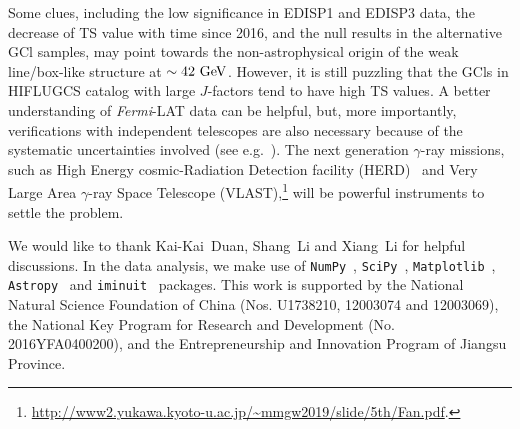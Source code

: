 \documentclass[
	twocolumn,
]{aastex6} %
\newcommand{\lat}{\emph{Fermi}-LAT\xspace}
\newcommand{\gr}{$\gamma$-ray\xspace}
\begin{document}
Some clues, including the low significance in EDISP1 and EDISP3 data,
the decrease of TS value with time since 2016, and the null results in the alternative GCl samples, may point towards the non-astrophysical origin of the weak line/box-like structure at $\sim 42~\rm GeV$.
However, it is still puzzling that the GCls in HIFLUGCS catalog with large $J$-factors tend to have high TS values.
A better understanding of \lat data can be helpful, but, more importantly, verifications with independent telescopes are also necessary because of the systematic uncertainties involved (see e.g.~\citet{Ackermann2013a}).
The next generation \gr missions, such as High Energy cosmic-Radiation Detection facility (HERD)~\citep{HERD2019} and Very Large Area \gr Space Telescope (VLAST),\footnote{\url{http://www2.yukawa.kyoto-u.ac.jp/~mmgw2019/slide/5th/Fan.pdf}.} will be powerful instruments to settle the problem.


\begin{acknowledgments}
    We would like to thank Kai-Kai~Duan, Shang~Li and Xiang~Li for helpful discussions.
    In the data analysis, we make use of {\tt NumPy}~\citep{numpy2020}, {\tt SciPy}~\citep{scipy2020}, {\tt Matplotlib}~\citep{matplotlib2007}, {\tt Astropy}~\citep{astropy2018} and {\tt iminuit}~\citep{iminuit} packages.
    This work is supported by the National Natural Science Foundation of China (Nos. U1738210, 12003074 and 12003069), the National Key Program for Research and Development (No. 2016YFA0400200), and the Entrepreneurship and Innovation Program of Jiangsu Province.
\end{acknowledgments}
\end{document}
